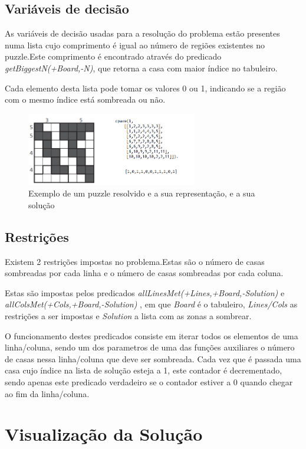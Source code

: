 \documentclass[runningheads,a4paper,12pt]{llncs}
\begin{document}
\subsection{Variáveis de decisão}

As variáveis de decisão usadas para a resolução do problema estão presentes numa lista cujo comprimento é igual ao número de regiões existentes no puzzle.Este comprimento é encontrado através do predicado \textit{getBiggestN(+Board,-N)}, que retorna a casa com maior índice no tabuleiro.

Cada elemento desta lista pode tomar os valores 0 ou 1, indicando se a região com o mesmo índice está sombreada ou não.
\begin{figure}
\centering
\includegraphics[height=3.2cm]{exemplo3.png}
\caption{Exemplo de um puzzle resolvido e a sua representação, e a sua solução} 
\label{fig:crazypavementexandsol}
\end{figure}


\subsection{Restrições}

Existem 2 restrições impostas no problema.Estas são o número de casas sombreadas por cada linha e o número de casas sombreadas por cada coluna.

Estas são impostas pelos predicados \textit{allLinesMet(+Lines,+Board,-Solution)} e \textit{allColsMet(+Cols,+Board,-Solution)} , em que \textit{Board} é o tabuleiro, \textit{Lines/Cols} as restrições a ser impostas e \textit{Solution} a lista com as zonas a sombrear.

O funcionamento destes predicados consiste em iterar todos os elementos de uma linha/coluna, sendo um dos parametros de uma das funções auxiliares o número de casas nessa linha/coluna que deve ser sombreada.
Cada vez que é passada uma casa cujo índice na lista de solução esteja a 1, este contador é decrementado, sendo apenas este predicado verdadeiro se o contador estiver a 0 quando chegar ao fim da linha/coluna.


\section{Visualização da Solução}
\end{document}
